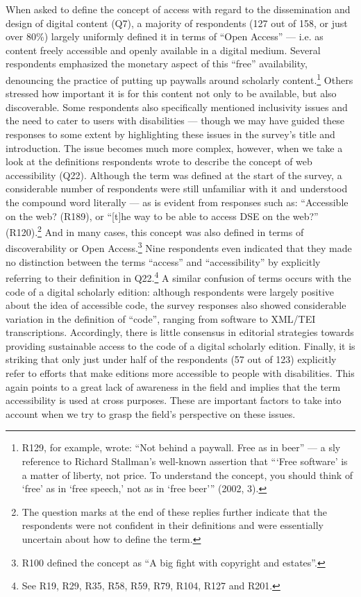 \begin{paper}
When asked to define the concept of access with regard to the
dissemination and design of digital content (Q7), a majority of
respondents (127 out of 158, or just over 80\%) largely uniformly
defined it in terms of ``Open Access'' --- i.e. as content freely
accessible and openly available in a digital medium. Several respondents
emphasized the monetary aspect of this ``free'' availability, denouncing
the practice of putting up paywalls around scholarly content.\footnote{R129,
  for example, wrote: ``Not behind a paywall. Free as in beer'' --- a sly
  reference to Richard Stallman's well-known assertion that ```Free
  software' is a matter of liberty, not price. To understand the
  concept, you should think of `free' as in `free speech,' not as in
  `free beer''' (2002, 3).} Others stressed how important it is for
this content not only to be available, but also discoverable. Some
respondents also specifically mentioned inclusivity issues and the need
to cater to users with disabilities --- though we may have guided these
responses to some extent by highlighting these issues in the survey's
title and introduction. The issue becomes much more complex, however,
when we take a look at the definitions respondents wrote to describe the
concept of web accessibility (Q22). Although the term was defined at the
start of the survey, a considerable number of respondents were still
unfamiliar with it and understood the compound word literally --- as is
evident from responses such as: ``Accessible on the web? (R189), or
``{[}t{]}he way to be able to access DSE on the web?'' (R120).\footnote{The
  question marks at the end of these replies further indicate that the
  respondents were not confident in their definitions and were
  essentially uncertain about how to define the term.} And in many
cases, this concept was also defined in terms of discoverability or Open
Access.\footnote{R100 defined the concept as ``A big fight with
  copyright and estates''.} Nine respondents even indicated that they
made no distinction between the terms ``access'' and ``accessibility''
by explicitly referring to their definition in Q22.\footnote{See R19,
  R29, R35, R58, R59, R79, R104, R127 and R201.} A similar confusion of
terms occurs with the code of a digital scholarly edition: although
respondents were largely positive about the idea of accessible code, the
survey responses also showed considerable variation in the definition of
``code'', ranging from software to XML/TEI transcriptions. Accordingly,
there is little consensus in editorial strategies towards providing
sustainable access to the code of a digital scholarly edition. Finally,
it is striking that only just under half of the respondents (57 out of
123) explicitly refer to efforts that make editions more accessible to
people with disabilities. This again points to a great lack of awareness
in the field and implies that the term accessibility is used at cross
purposes. These are important factors to take into account when we try
to grasp the field's perspective on these issues.


\end{paper}
